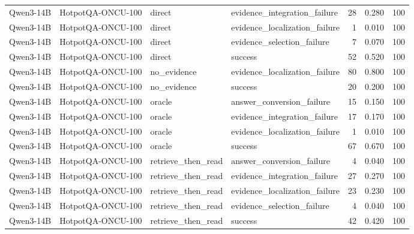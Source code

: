 \begin{tabular}{llllrrr}
Qwen3-14B & HotpotQA-ONCU-100 & direct & evidence_integration_failure & 28 & 0.280 & 100 \\
Qwen3-14B & HotpotQA-ONCU-100 & direct & evidence_localization_failure & 1 & 0.010 & 100 \\
Qwen3-14B & HotpotQA-ONCU-100 & direct & evidence_selection_failure & 7 & 0.070 & 100 \\
Qwen3-14B & HotpotQA-ONCU-100 & direct & success & 52 & 0.520 & 100 \\
Qwen3-14B & HotpotQA-ONCU-100 & no_evidence & evidence_localization_failure & 80 & 0.800 & 100 \\
Qwen3-14B & HotpotQA-ONCU-100 & no_evidence & success & 20 & 0.200 & 100 \\
Qwen3-14B & HotpotQA-ONCU-100 & oracle & answer_conversion_failure & 15 & 0.150 & 100 \\
Qwen3-14B & HotpotQA-ONCU-100 & oracle & evidence_integration_failure & 17 & 0.170 & 100 \\
Qwen3-14B & HotpotQA-ONCU-100 & oracle & evidence_localization_failure & 1 & 0.010 & 100 \\
Qwen3-14B & HotpotQA-ONCU-100 & oracle & success & 67 & 0.670 & 100 \\
Qwen3-14B & HotpotQA-ONCU-100 & retrieve_then_read & answer_conversion_failure & 4 & 0.040 & 100 \\
Qwen3-14B & HotpotQA-ONCU-100 & retrieve_then_read & evidence_integration_failure & 27 & 0.270 & 100 \\
Qwen3-14B & HotpotQA-ONCU-100 & retrieve_then_read & evidence_localization_failure & 23 & 0.230 & 100 \\
Qwen3-14B & HotpotQA-ONCU-100 & retrieve_then_read & evidence_selection_failure & 4 & 0.040 & 100 \\
Qwen3-14B & HotpotQA-ONCU-100 & retrieve_then_read & success & 42 & 0.420 & 100 \\
\bottomrule
\end{tabular}
